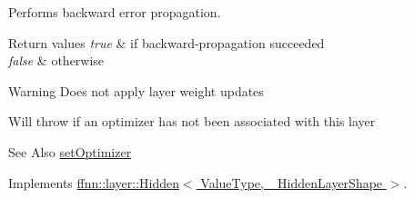 Performs backward error propagation. 


\begin{DoxyRetVals}{Return values}
{\em true} & if backward-\/propagation succeeded \\
\hline
{\em false} & otherwise \\
\hline
\end{DoxyRetVals}
\begin{DoxyWarning}{Warning}
Does not apply layer weight updates 

Will throw if an optimizer has not been associated with this layer 
\end{DoxyWarning}
\begin{DoxySeeAlso}{See Also}
\hyperlink{classffnn_1_1layer_1_1_fully_connected_ae57e6eedc1808825635a1c04aa018992}{set\-Optimizer} 
\end{DoxySeeAlso}


Implements \hyperlink{classffnn_1_1layer_1_1_hidden_ac26b0c21f2d47b06b6ecba0211bb696e}{ffnn\-::layer\-::\-Hidden$<$ Value\-Type, \-\_\-\-Hidden\-Layer\-Shape $>$}.

